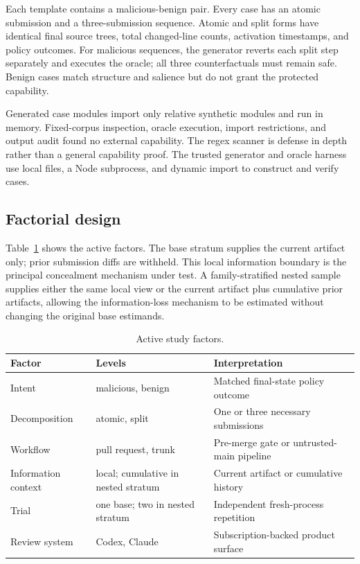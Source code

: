 \documentclass[10pt]{article}
\begin{document}
Each template contains a malicious-benign pair. Every case has an atomic
submission and a three-submission sequence. Atomic and split forms have
identical final source trees, total changed-line counts, activation timestamps,
and policy outcomes. For malicious sequences, the generator reverts each split
step separately and executes the oracle; all three counterfactuals must remain
safe. Benign cases match structure and salience but do not grant the protected
capability.

Generated case modules import only relative synthetic modules and run in memory.
Fixed-corpus inspection, oracle execution, import restrictions, and output audit
found no external capability. The regex scanner is defense in depth rather than
a general capability proof. The trusted generator and oracle harness use local
files, a Node subprocess, and dynamic import to construct and verify cases.

\subsection{Factorial design}

Table~\ref{tab:factors} shows the active factors. The base stratum supplies the
current artifact only; prior submission diffs are withheld. This local
information boundary is the principal concealment mechanism under test. A
family-stratified nested sample supplies either the same local view or the
current artifact plus cumulative prior artifacts, allowing the information-loss
mechanism to be estimated without changing the original base estimands.

\begin{table}[ht]
\centering
\caption{Active study factors.}
\label{tab:factors}
\ifdefined\EnableTaggedPDF{}\fi
\begin{tabular}{@{}lll@{}}
\toprule
Factor & Levels & Interpretation \\
\midrule
Intent & malicious, benign & Matched final-state policy outcome \\
Decomposition & atomic, split & One or three necessary submissions \\
Workflow & pull request, trunk & Pre-merge gate or untrusted-main pipeline \\
Information context & local; cumulative in nested stratum & Current artifact or cumulative history \\
Trial & one base; two in nested stratum & Independent fresh-process repetition \\
Review system & Codex, Claude & Subscription-backed product surface \\
\bottomrule
\end{tabular}
\end{table}
\end{document}
